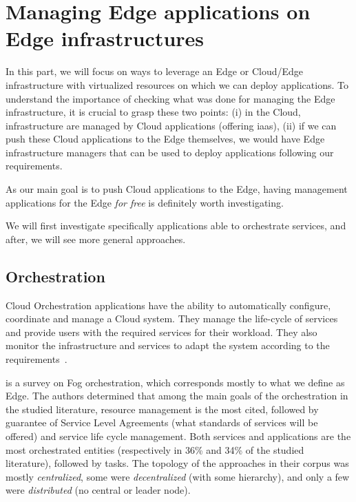 \chapter{Managing Edge applications on Edge infrastructures}
\label{chap:soa-edge-infra}

In this part, we will focus on ways to leverage an Edge or
Cloud/Edge infrastructure with virtualized resources on which we
can deploy applications.
%
To understand the importance of checking what was done for managing
the Edge infrastructure, it is crucial to grasp these two points: (i)
in the Cloud, infrastructure are managed by Cloud applications
(offering \acrshort{iaas}), (ii) if we can push these Cloud
applications to the Edge themselves, we would have Edge infrastructure
managers that can be used to deploy applications following our
requirements.

As our main goal is to push Cloud applications to the Edge, having
management applications for the Edge \emph{for free} is definitely
worth investigating.

We will first investigate specifically applications able to
orchestrate services, and after, we will see more general approaches.



\section{Orchestration}
\label{sec:orchestration}


Cloud Orchestration applications have the ability to automatically
configure, coordinate and manage a Cloud system.
%
They manage the life-cycle of services and provide users with the
required services for their workload.
%
They also monitor the infrastructure and services to adapt the system
according to the requirements~\cite{DP06}.

\cite{CBCA23} is a survey on Fog orchestration, which corresponds
mostly to what we define as Edge.
%
The authors determined that among the main goals of the orchestration
in the studied literature, resource management is the most cited,
followed by guarantee of Service Level Agreements (what standards of
services will be offered) and service life cycle management.
%
Both services and applications are the most orchestrated entities
(respectively in 36\% and 34\% of the studied literature), followed by
tasks.
%
The topology of the approaches in their corpus was mostly
\emph{centralized}, some were \emph{decentralized} (with some
hierarchy), and only a few were \emph{distributed} (no central or
leader node).


